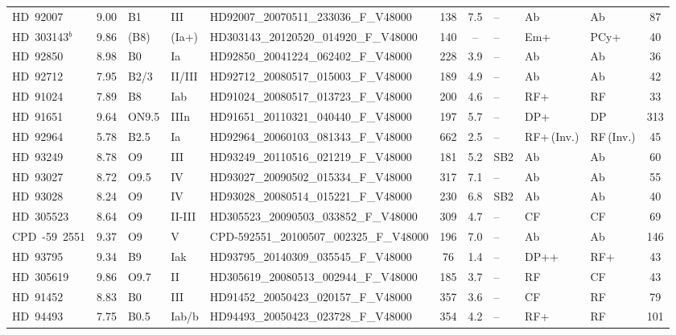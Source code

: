 {\begin{landscape}
\begin{longtable}{lclllcclllc}
\noalign{\smallskip}
HD~92007 & 9.00 & B1 & III & HD92007\_20070511\_233036\_F\_V48000 & 138 & 7.5 & -- & Ab & Ab & 87 \\
\noalign{\smallskip}
HD~303143$^{b}$ & 9.86 & (B8) & (Ia+) & HD303143\_20120520\_014920\_F\_V48000 & 140 & -- & -- & Em+ & PCy+ & 40 \\
\noalign{\smallskip}
HD~92850 & 8.98 & B0 & Ia & HD92850\_20041224\_062402\_F\_V48000 & 228 & 3.9 & -- & Ab & Ab & 36 \\
\noalign{\smallskip}
HD~92712 & 7.95 & B2/3 & II/III & HD92712\_20080517\_015003\_F\_V48000 & 189 & 4.9 & -- & Ab & Ab & 42 \\
\noalign{\smallskip}
HD~91024 & 7.89 & B8 & Iab & HD91024\_20080517\_013723\_F\_V48000 & 200 & 4.6 & -- & RF+ & RF & 33 \\
\noalign{\smallskip}
HD~91651 & 9.64 & ON9.5 & IIIn & HD91651\_20110321\_040440\_F\_V48000 & 197 & 5.7 & -- & DP+ & DP & 313 \\
\noalign{\smallskip}
HD~92964 & 5.78 & B2.5 & Ia & HD92964\_20060103\_081343\_F\_V48000 & 662 & 2.5 & -- & RF+\,(Inv.) & RF\,(Inv.) & 45 \\
\noalign{\smallskip}
HD~93249 & 8.78 & O9 & III & HD93249\_20110516\_021219\_F\_V48000 & 181 & 5.2 & SB2 & Ab & Ab & 60 \\
\noalign{\smallskip}
HD~93027 & 8.72 & O9.5 & IV & HD93027\_20090502\_015334\_F\_V48000 & 317 & 7.1 & -- & Ab & Ab & 55 \\
\noalign{\smallskip}
HD~93028 & 8.24 & O9 & IV & HD93028\_20080514\_015221\_F\_V48000 & 230 & 6.8 & SB2 & Ab & Ab & 40 \\
\noalign{\smallskip}
HD~305523 & 8.64 & O9 & II-III & HD305523\_20090503\_033852\_F\_V48000 & 309 & 4.7 & -- & CF & CF & 69 \\
\noalign{\smallskip}
CPD~-59~2551 & 9.37 & O9 & V & CPD-592551\_20100507\_002325\_F\_V48000 & 196 & 7.0 & -- & Ab & Ab & 146 \\
\noalign{\smallskip}
HD~93795 & 9.34 & B9 & Iak & HD93795\_20140309\_035545\_F\_V48000 & 76 & 1.4 & -- & DP++ & RF+ & 43 \\
\noalign{\smallskip}
HD~305619 & 9.86 & O9.7 & II & HD305619\_20080513\_002944\_F\_V48000 & 185 & 3.7 & -- & RF & CF & 43 \\
\noalign{\smallskip}
HD~91452 & 8.83 & B0 & III & HD91452\_20050423\_020157\_F\_V48000 & 357 & 3.6 & -- & CF & RF & 79 \\
\noalign{\smallskip}
HD~94493 & 7.75 & B0.5 & Iab/b & HD94493\_20050423\_023728\_F\_V48000 & 354 & 4.2 & -- & RF+ & RF & 101 \\

\end{longtable}
\end{landscape}}

